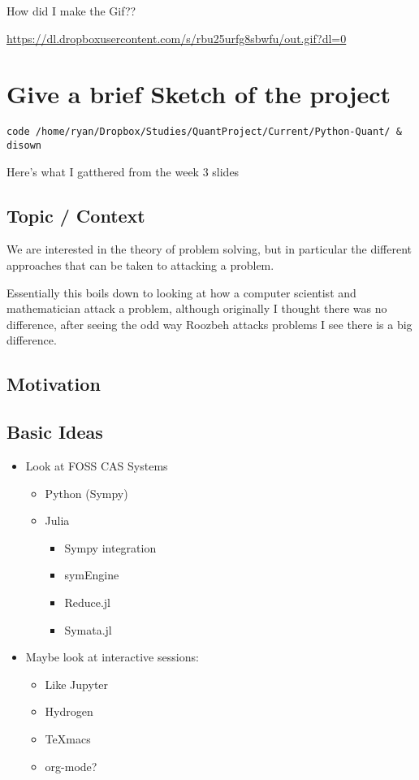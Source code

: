 \documentclass[11pt]{article}
\begin{document}
How did I make the Gif??

\url{https://dl.dropboxusercontent.com/s/rbu25urfg8sbwfu/out.gif?dl=0}

\section{Give a brief Sketch of the project}
\label{sec:org790e88b}

\begin{verbatim}
code /home/ryan/Dropbox/Studies/QuantProject/Current/Python-Quant/ & disown
\end{verbatim}

Here's what I gatthered from the week 3 slides

\subsection{Topic / Context}
\label{sec:orgd09abda}
We are interested in the theory of problem solving, but in particular the
different approaches that can be taken to attacking a problem.

Essentially this boils down to looking at how a computer scientist and
mathematician attack a problem, although originally I thought there was no
difference, after seeing the odd way Roozbeh attacks problems I see there is a big difference.
\subsection{Motivation}
\label{sec:orgb027b09}

\subsection{Basic Ideas}
\label{sec:org1475b3b}
\begin{itemize}
\item Look at FOSS CAS Systems
\begin{itemize}
\item Python (Sympy)
\item Julia
\begin{itemize}
\item Sympy integration
\item symEngine
\item Reduce.jl
\item Symata.jl
\end{itemize}
\end{itemize}

\item Maybe look at interactive sessions:
\begin{itemize}
\item Like Jupyter
\item Hydrogen
\item TeXmacs
\item org-mode?
\end{itemize}
\end{itemize}
\end{document}
